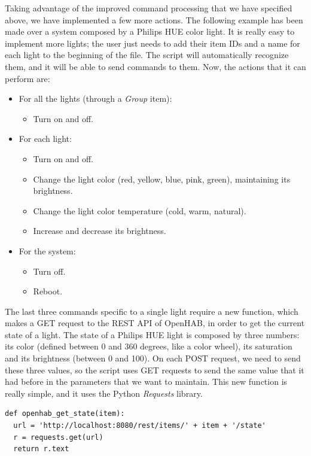 Taking advantage of the improved command processing that we have specified above, we have implemented a few more actions. The following
example has been made over a system composed by a Philips HUE color light. It is really easy to implement more lights; the user just
needs to add their item IDs and a name for each light to the beginning of the file. The script will automatically recognize them,
and it will be able to send commands to them. Now, the actions that it can perform are:
\begin{itemize}
	\item For all the lights (through a \textit{Group} item):
	\begin{itemize}
		\item Turn on and off.
	\end{itemize}
	\item For each light:
	\begin{itemize}
		\item Turn on and off.
		\item Change the light color (red, yellow, blue, pink, green), maintaining its brightness.
		\item Change the light color temperature (cold, warm, natural).
		\item Increase and decrease its brightness.
	\end{itemize}
	\item For the system:
	\begin{itemize}
		\item Turn off.
		\item Reboot.
	\end{itemize}
\end{itemize}

The last three commands specific to a single light require a new function, which makes a GET request to the REST API of OpenHAB,
in order to get the current state of a light. The state of a Philips HUE light is composed by three numbers: its color (defined
between 0 and 360 degrees, like a color wheel), its saturation and its brightness (between 0 and 100). On each POST request, we need
to send these three values, so the script uses GET requests to send the same value that it had before in the parameters that we want
to maintain. This new function is really simple, and it uses the Python \textit{Requests} library.\cite{requestsDocumentation}

\begin{lstlisting}[style=PythonCode]
def openhab_get_state(item):
  url = 'http://localhost:8080/rest/items/' + item + '/state'
  r = requests.get(url)
  return r.text
\end{lstlisting}

